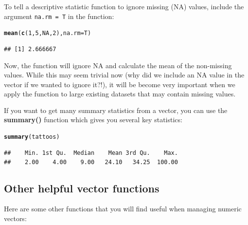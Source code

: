 \documentclass{tufte-book}\usepackage[]{graphicx}\usepackage[]{color}
\makeatletter
\newcommand{\hlnum}[1]{\textcolor[rgb]{0.686,0.059,0.569}{#1}}%
\newcommand{\hlstd}[1]{\textcolor[rgb]{0.345,0.345,0.345}{#1}}%
\newcommand{\hlkwc}[1]{\textcolor[rgb]{0.333,0.667,0.333}{#1}}%
\newcommand{\hlkwd}[1]{\textcolor[rgb]{0.737,0.353,0.396}{\textbf{#1}}}%
\newenvironment{kframe}{%
 \def\at@end@of@kframe{}%
 \ifinner\ifhmode%
  \def\at@end@of@kframe{\end{minipage}}%
  \begin{minipage}{\columnwidth}%
 \fi\fi%
 \def\FrameCommand##1{\hskip\@totalleftmargin \hskip-\fboxsep
 \colorbox{shadecolor}{##1}\hskip-\fboxsep
     \hskip-\linewidth \hskip-\@totalleftmargin \hskip\columnwidth}%
 \MakeFramed {\advance\hsize-\width
   \@totalleftmargin\z@ \linewidth\hsize
   \@setminipage}}%
 {\par\unskip\endMakeFramed%
 \at@end@of@kframe}
\newenvironment{knitrout}{}{} %
\makeatother
\begin{document}
To tell a descriptive statistic function to ignore missing (NA) values, include the argument \texttt{na.rm = T} in the function:

\begin{knitrout}
\color{fgcolor}\begin{kframe}
\begin{alltt}
\hlkwd{mean}\hlstd{(}\hlkwd{c}\hlstd{(}\hlnum{1}\hlstd{,} \hlnum{5}\hlstd{,} \hlnum{NA}\hlstd{,} \hlnum{2}\hlstd{),} \hlkwc{na.rm} \hlstd{= T)}
\end{alltt}
\begin{verbatim}
## [1] 2.666667
\end{verbatim}
\end{kframe}
\end{knitrout}

Now, the function will ignore NA and calculate the mean of the non-missing values. While this may seem trivial now (why did we include an NA value in the vector if we wanted to ignore it?!), it will be become very important when we apply the function to large existing datasets that may contain missing values.


If you want to get many summary statistics from a vector, you can use the \textbf{summary()} function which gives you several key statistics:

\begin{footnotesize}
\begin{knitrout}
\color{fgcolor}\begin{kframe}
\begin{alltt}
\hlkwd{summary}\hlstd{(tattoos)}
\end{alltt}
\begin{verbatim}
##    Min. 1st Qu.  Median    Mean 3rd Qu.    Max. 
##    2.00    4.00    9.00   24.10   34.25  100.00
\end{verbatim}
\end{kframe}
\end{knitrout}
\end{footnotesize}



\subsection{Other helpful vector functions}

Here are some other functions that you will find useful when managing numeric vectors:
\end{document}
